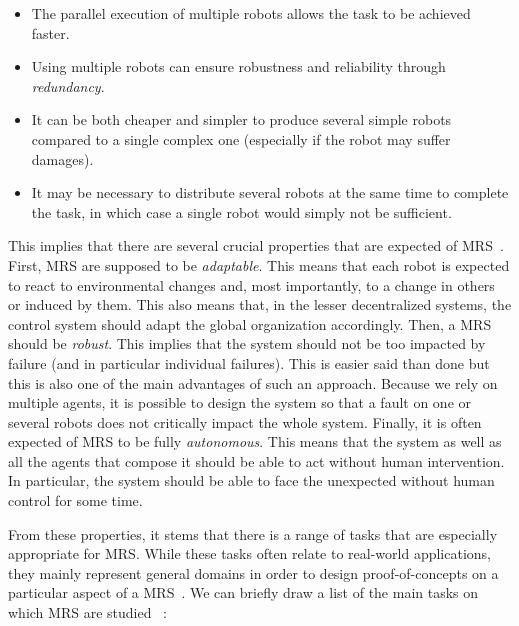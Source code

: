     \begin{itemize}
      \item{The parallel execution of multiple robots allows the task to be achieved faster.}
      \item{Using multiple robots can ensure robustness and reliability through \emph{redundancy}.}
      \item{It can be both cheaper and simpler to produce several simple robots compared to a single complex one (especially if the robot may suffer damages).}
      \item{It may be necessary to distribute several robots at the same time to complete the task, in which case a single robot would simply not be sufficient.}
    \end{itemize}

    This implies that there are several crucial properties that are expected of MRS~\parencite{Parker1994}. First, MRS are supposed to be \emph{adaptable}. This means that each robot is expected to react to environmental changes and, most importantly, to a change in others or induced by them. This also means that, in the lesser decentralized systems, the control system should adapt the global organization accordingly. Then, a MRS should be \emph{robust}. This implies that the system should not be too impacted by failure (and in particular individual failures). This is easier said than done but this is also one of the main advantages of such an approach. Because we rely on multiple agents, it is possible to design the system so that a fault on one or several robots does not critically impact the whole system. Finally, it is often expected of MRS to be fully \emph{autonomous}. This means that the system as well as all the agents that compose it should be able to act without human intervention. In particular, the system should be able to face the unexpected without human control for some time.

    From these properties, it stems that there is a range of tasks that are especially appropriate for MRS. While these tasks often relate to real-world applications, they mainly represent general domains in order to design proof-of-concepts on a particular aspect of a MRS~\parencite{Parker2000}. We can briefly draw a list of the main tasks on which MRS are studied~\parencite{Cao1997, Parker2000, Farinelli2004} :

